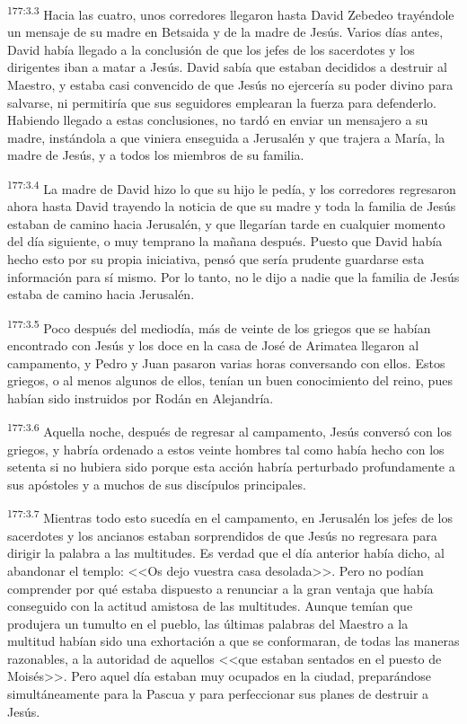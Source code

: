 \par 
\textsuperscript{177:3.3} Hacia las cuatro, unos corredores llegaron hasta David Zebedeo trayéndole un mensaje de su madre en Betsaida y de la madre de Jesús. Varios días antes, David había llegado a la conclusión de que los jefes de los sacerdotes y los dirigentes iban a matar a Jesús. David sabía que estaban decididos a destruir al Maestro, y estaba casi convencido de que Jesús no ejercería su poder divino para salvarse, ni permitiría que sus seguidores emplearan la fuerza para defenderlo. Habiendo llegado a estas conclusiones, no tardó en enviar un mensajero a su madre, instándola a que viniera enseguida a Jerusalén y que trajera a María, la madre de Jesús, y a todos los miembros de su familia.

\par 
\textsuperscript{177:3.4} La madre de David hizo lo que su hijo le pedía, y los corredores regresaron ahora hasta David trayendo la noticia de que su madre y toda la familia de Jesús estaban de camino hacia Jerusalén, y que llegarían tarde en cualquier momento del día siguiente, o muy temprano la mañana después. Puesto que David había hecho esto por su propia iniciativa, pensó que sería prudente guardarse esta información para sí mismo. Por lo tanto, no le dijo a nadie que la familia de Jesús estaba de camino hacia Jerusalén.

\par 
\textsuperscript{177:3.5} Poco después del mediodía, más de veinte de los griegos que se habían encontrado con Jesús y los doce en la casa de José de Arimatea llegaron al campamento, y Pedro y Juan pasaron varias horas conversando con ellos. Estos griegos, o al menos algunos de ellos, tenían un buen conocimiento del reino, pues habían sido instruidos por Rodán en Alejandría.

\par 
\textsuperscript{177:3.6} Aquella noche, después de regresar al campamento, Jesús conversó con los griegos, y habría ordenado a estos veinte hombres tal como había hecho con los setenta si no hubiera sido porque esta acción habría perturbado profundamente a sus apóstoles y a muchos de sus discípulos principales.

\par 
\textsuperscript{177:3.7} Mientras todo esto sucedía en el campamento, en Jerusalén los jefes de los sacerdotes y los ancianos estaban sorprendidos de que Jesús no regresara para dirigir la palabra a las multitudes. Es verdad que el día anterior había dicho, al abandonar el templo: <<Os dejo vuestra casa desolada>>. Pero no podían comprender por qué estaba dispuesto a renunciar a la gran ventaja que había conseguido con la actitud amistosa de las multitudes. Aunque temían que produjera un tumulto en el pueblo, las últimas palabras del Maestro a la multitud habían sido una exhortación a que se conformaran, de todas las maneras razonables, a la autoridad de aquellos <<que estaban sentados en el puesto de Moisés>>. Pero aquel día estaban muy ocupados en la ciudad, preparándose simultáneamente para la Pascua y para perfeccionar sus planes de destruir a Jesús.

